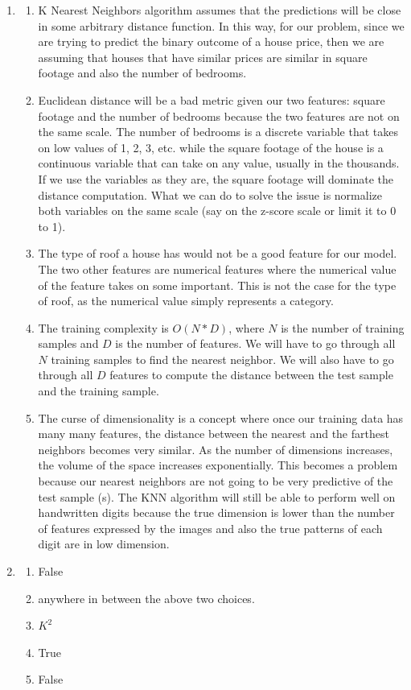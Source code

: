 \documentclass[12pt]{article}
\begin{document}
\begin{enumerate}
\begin{enumerate}
  \end{enumerate}
 \item
 \begin{enumerate}
     \item K Nearest Neighbors algorithm assumes that the predictions will be close in some arbitrary distance function. In this way, for our problem, since we are trying to predict the binary outcome of a house price, then we are assuming that houses that have similar prices are similar in square footage and also the number of bedrooms.
     \item Euclidean distance will be a bad metric given our two features: square footage and the number of bedrooms because the two features are not on the same scale. The number of bedrooms is a discrete variable that takes on low values of 1, 2, 3, etc. while the square footage of the house is a continuous variable that can take on any value, usually in the thousands. If we use the variables as they are, the square footage will dominate the distance computation. What we can do to solve the issue is normalize both variables on the same scale (say on the z-score scale or limit it to 0 to 1).
     \item The type of roof a house has would not be a good feature for our model. The two other features are numerical features where the numerical value of the feature takes on some important. This is not the case for the type of roof, as the numerical value simply represents a category. 
     \item The training complexity is $O(N * D)$, where $N$ is the number of training samples and $D$ is the number of features. We will have to go through all $N$ training samples to find the nearest neighbor. We will also have to go through all $D$ features to compute the distance between the test sample and the training sample.
     \item The curse of dimensionality is a concept where once our training data has many many features, the distance between the nearest and the farthest neighbors becomes very similar. As the number of dimensions increases, the volume of the space increases exponentially. This becomes a problem because our nearest neighbors are not going to be very predictive of the test sample (s).
     The KNN algorithm will still be able to perform well on handwritten digits because the true dimension is lower than the number of features expressed by the images and also the true patterns of each digit are in low dimension. 
 \end{enumerate}

 \item 
 \begin{enumerate}
      \item False 
      \item anywhere in between the above two choices.
      \item $K^2$
      \item True
      \item False
 \end{enumerate}

\end{enumerate}
\end{document}

